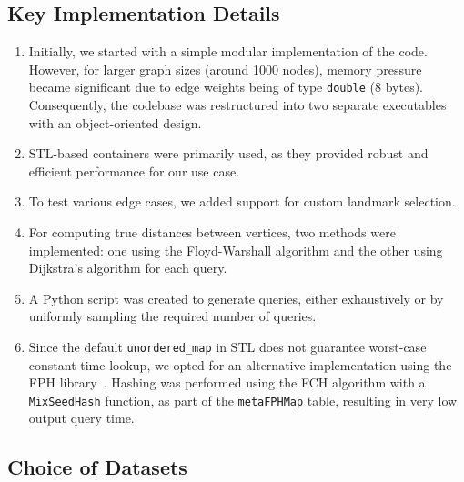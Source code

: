 \documentclass{article}
\begin{document}
\subsection*{Key Implementation Details}

\begin{enumerate}
    \item Initially, we started with a simple modular implementation of the code. However, for larger graph sizes (around 1000 nodes), memory pressure became significant due to edge weights being of type \texttt{double} (8 bytes). Consequently, the codebase was restructured into two separate executables with an object-oriented design.
    
    \item STL-based containers were primarily used, as they provided robust and efficient performance for our use case.
    
    \item To test various edge cases, we added support for custom landmark selection.
    
    \item For computing true distances between vertices, two methods were implemented: one using the Floyd-Warshall algorithm and the other using Dijkstra's algorithm for each query.
    
    \item A Python script was created to generate queries, either exhaustively or by uniformly sampling the required number of queries.
    
    \item Since the default \texttt{unordered\_map} in STL does not guarantee worst-case constant-time lookup, we opted for an alternative implementation using the FPH library~\cite{fphlib}. Hashing was performed using the FCH algorithm with a \texttt{MixSeedHash} function, as part of the \texttt{metaFPHMap} table, resulting in very low output query time.
\end{enumerate}

\subsection*{Choice of Datasets}
\end{document}

